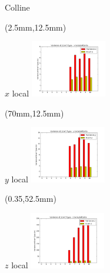 \documentclass[10pt]{beamer}
\begin{document}
	\begin{frame}{Colline}
		\begin{textblock*}{60mm}(2.5mm,12.5mm)
			\begin{block}{$x$ local}
				\includegraphics[width=125px]{../src/data/itinary_4/var_ecart_sat_x4.png}
			\end{block}
		\end{textblock*}

		\begin{textblock*}{60mm}(70mm,12.5mm)
			\begin{block}{$y$ local}
				\includegraphics[width=125px]{../src/data/itinary_4/var_ecart_sat_y4.png}
			\end{block}
		\end{textblock*}

		\begin{textblock*}{60mm}(0.35\textwidth,52.5mm)
			\begin{block}{$z$ local}
				\includegraphics[width=125px]{../src/data/itinary_4/var_ecart_sat_z4.png}
			\end{block}
		\end{textblock*}
	\end{frame}
\end{document}
